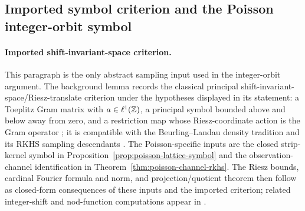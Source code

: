 
\subsection{Imported symbol criterion and the Poisson integer-orbit symbol}%
\label{subsec:lattice-background-poisson-symbol}

\paragraph{Imported shift-invariant-space criterion.}
This paragraph is the only abstract sampling input used in the integer-orbit
argument.  The background lemma records the classical principal
shift-invariant-space/Riesz-translate criterion under the hypotheses displayed
in its statement: a Toeplitz Gram matrix with $a\in\ell^1(\mathbb{Z})$, a principal
symbol bounded above and below away from zero, and a restriction map whose
Riesz-coordinate action is the Gram operator
\cite{deBoorDeVoreRon1994,RonShen1995,Bownik2000,AldroubiGrochenig2001}; it is
compatible with the Beurling--Landau density tradition and its RKHS sampling
descendants
\cite{Beurling1989,Landau1967,Seip1992,NashedWalter1991,NashedSun2010,ChengJiangSun2016,FuhrGrochenigHaimiKlotzRomero2018}.
The Poisson-specific
inputs are the closed strip-kernel symbol in
Proposition~\ref{prop:poisson-lattice-symbol} and the observation-channel
identification in Theorem~\ref{thm:poisson-channel-rkhs}.  The Riesz bounds,
cardinal Fourier formula and norm, and projection/quotient theorem then follow
as closed-form consequences of these inputs and the imported criterion; related
integer-shift and nod-function computations appear in
\cite{KiselevMininNovikov2016,KiselevMininNovikov2019}.

